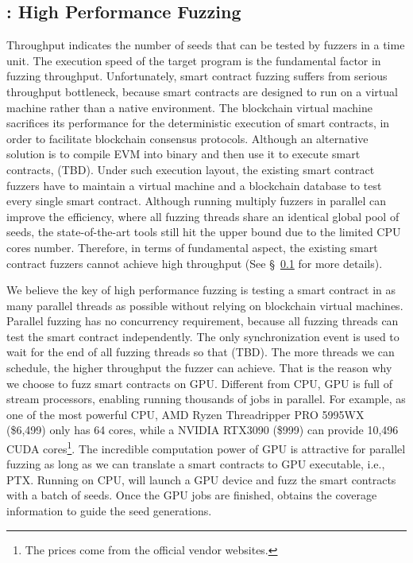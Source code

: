 \subsection{{\runner}: High Performance Fuzzing}
Throughput indicates the number of seeds that can be tested by fuzzers in a time unit. The execution speed of the target program is the fundamental factor in fuzzing throughput\cite{fuzzan_atc}. 
Unfortunately, smart contract fuzzing suffers from serious throughput bottleneck, because smart contracts are designed to run on a virtual machine rather than a native environment. 
The blockchain virtual machine sacrifices its performance for the deterministic execution of smart contracts, in order to facilitate blockchain consensus protocols.
%
Although an alternative solution is to compile EVM into binary and then use it to execute smart contracts, (TBD).
%
Under such execution layout, the existing smart contract fuzzers have to maintain a virtual machine and a blockchain database to test every single smart contract. 
%
Although running multiply fuzzers in parallel can improve the efficiency\cite{confuzzius_eurosp,echidna_issta ,afl,angora_sp,enfuzz_sec}, where all fuzzing threads share an identical global pool of seeds, the state-of-the-art tools still hit the upper bound due to the limited CPU cores number.
%
Therefore, in terms of fundamental aspect, the existing smart contract fuzzers cannot achieve high throughput (See \S~\ref{} for more details).
%

We believe the key of high performance fuzzing is testing a smart contract in as many parallel threads as possible without relying on blockchain virtual machines. 
%
Parallel fuzzing has no concurrency requirement, because all fuzzing threads can test the smart contract independently. The only synchronization event is used to wait for the end of all fuzzing threads so that (TBD).
%
The more threads we can schedule, the higher throughput the fuzzer can achieve.
That is the reason why we choose to fuzz smart contracts on GPU. 
Different from CPU, GPU is full of stream processors, enabling running thousands of jobs in parallel. 
For example, as one of the most powerful CPU, AMD Ryzen Threadripper PRO 5995WX (\$6,499) only has 64 cores, while a NVIDIA RTX3090 (\$999) can provide 10,496 CUDA cores\footnote{The prices come from the official vendor websites.}. 
The incredible computation power of GPU is attractive for parallel fuzzing as long as we can translate a smart contracts to GPU executable, i.e., PTX\cite{ptx2021doc}. 
%
Running on CPU, {\runner} will launch a GPU device and fuzz the smart contracts with a batch of seeds. Once the GPU jobs are finished, {\runner} obtains the coverage information to guide the seed generations. 

